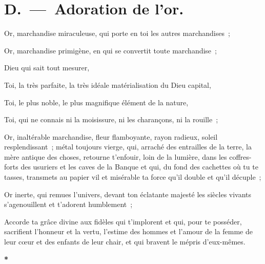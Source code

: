 \documentclass[french,twoside]{book} %
\begin{document}
\begin{center}
\end{center}

\section[{D. — Adoration de l’or.}]{D. — Adoration de l’or.}
Or, marchandise miraculeuse, qui porte en toi les autres marchandises ;\par
Or, marchandise primigène, en qui se convertit toute marchandise ;\par
Dieu qui sait tout mesurer,\par
Toi, la très parfaite, la très idéale matérialisation du Dieu capital,\par
Toi, le plus noble, le plus magnifique élément de la nature,\par
Toi, qui ne connais ni la moisissure, ni les charançons, ni la rouille ;\par
Or, inaltérable marchandise, fleur flamboyante, rayon radieux, soleil resplendissant ; métal toujours vierge, qui, arraché des entrailles de la terre, la mère antique des choses, retourne t’enfouir, loin de la lumière, dans les coffres-forts des usuriers et les caves de la Banque et qui, du fond des cachettes où tu te tasses, transmets au papier vil et misérable ta force qu’il double et qu’il décuple ;\par
Or inerte, qui remues l’univers, devant ton éclatante majesté les siècles vivants s’agenouillent et t’adorent humblement ;\par
Accorde ta grâce divine aux fidèles qui t’implorent et qui, pour te posséder, sacrifient l’honneur et la vertu, l’estime des hommes et l’amour de la femme de leur cœur et des enfants de leur chair, et qui bravent le mépris d’eux-mêmes.\par

\begin{center}
\noindent \textbf{*}\par
\end{center}
\end{document}

